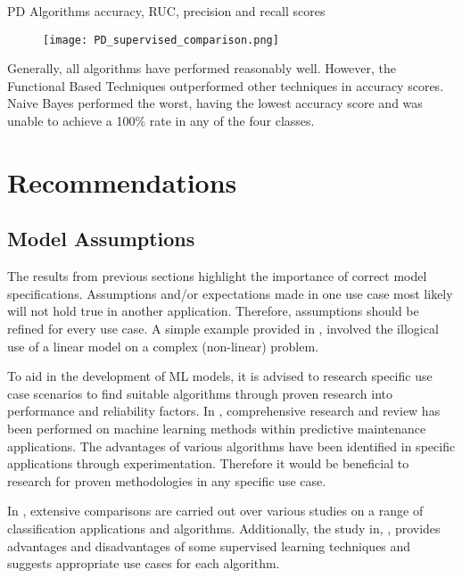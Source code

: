 \bigskip
\begin{table}[h]
    \caption{PD Algorithms accuracy, RUC, precision and recall scores \cite{8300383}}
    \begin{figure}[H]
        \texttt{[image: PD\_supervised\_comparison.png]}
        \centering
    \end{figure}
    \label{fig:PD_table}
\end{table}

Generally, all algorithms have performed reasonably well. However, the Functional Based Techniques outperformed other techniques in accuracy scores. 
Naive Bayes performed the worst, having the lowest accuracy score and was unable to achieve a 100\% rate in any of the four classes.


\section{Recommendations}
\subsection{Model Assumptions}
The results from previous sections highlight the importance of correct model specifications. 
Assumptions and/or expectations made in one use case most likely will not hold true in another application.
Therefore, assumptions should be refined for every use case.
A simple example provided in \cite{saria2019tutorial}, involved the illogical use of a linear model on a complex (non-linear) problem.

To aid in the development of ML models, it is advised to research specific use case scenarios to find suitable algorithms through proven research into performance and reliability factors.
In \cite{pdm_review}, comprehensive research and review has been performed on machine learning methods within predictive maintenance applications.
The advantages of various algorithms have been identified in specific applications through experimentation. 
Therefore it would be beneficial to research for proven methodologies in any specific use case.  

In \cite{10.1016/j.eswa.2017.04.003}, extensive comparisons are carried out over various studies on a range of classification applications and algorithms.
Additionally, the study in, \cite{7724478}, provides advantages and disadvantages of some supervised learning techniques and suggests appropriate use cases for each algorithm.

